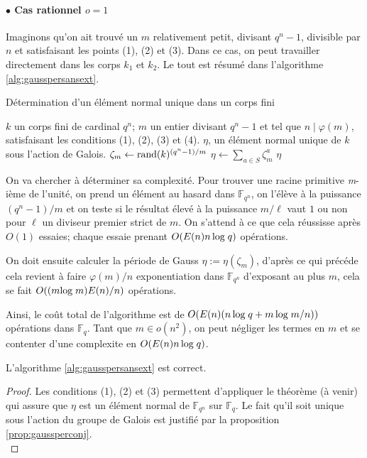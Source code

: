 \documentclass[a4paper]{article} %
\numberwithin{section}{part}
\numberwithin{equation}{section}
\newcommand\nroot[1]{\textit{#1}-ième}
\newcommand\GF[1]{\mathbb{F}_{#1}}
\begin{document}
\paragraph{$\bullet$ Cas rationnel $o = 1$}
Imaginons qu'on ait trouvé un $m$ relativement petit, divisant $q^n - 1$,
divisible par $n$ et satisfaisant les points (1), (2) et (3). Dans ce cas, on 
peut travailler directement dans les corps $k_1$ et $k_2$. Le tout est résumé
dans l'algorithme \ref{alg:gausspersansext}.

\begin{algorithm}
\caption{Détermination d'un élément normal unique dans un corps fini}
\label{alg:gausspersansext}
\begin{algorithmic}[1]
\REQUIRE $k$ un corps fini de cardinal $q^n$; $m$ un entier 
divisant $q^n - 1$ et tel que $n\mid\varphi(m)$, satisfaisant les conditions 
(1), (2), (3) et (4).
\ENSURE $\eta$, un élément normal unique de $k$ sous l'action de Galois.
\bigskip
\REPEAT
    \STATE $\zeta_m \leftarrow \textup{rand}(k)^{(q^n - 1)/m}$
\STATE $\eta \leftarrow \sum_{a\in S}{\zeta_m^a}$
\RETURN $\eta$
\end{algorithmic}
\end{algorithm}
On va chercher à déterminer sa complexité. Pour trouver une racine primitive 
\nroot{m} de l'unité, on prend un élément au hasard dans $\GF{q^n}$, on l'élève 
à la puissance $(q^n - 1)/m$ et on teste si le résultat élevé à la puissance 
$m/\ell$ vaut $1$ ou non pour $\ell$ un diviseur premier strict de $m$. On 
s'attend à ce que cela réussisse après $O(1)$ essaies; chaque essaie prenant 
$O(E(n)n\,\textup{log\;}q)$ opérations.\par
On doit ensuite calculer la période de Gauss $\eta := \eta(\zeta_m)$,
d'après ce qui précéde cela revient à faire $\varphi(m)/n$ exponentiation dans
$\GF{q^n}$ d'exposant au plus $m$, cela se fait $O((m\textup{log\;}m)E(n)/n)$
opérations.\par
Ainsi, le coût total de l'algorithme est de $O(E(n)(n\,\textup{log\;}q +
m\,\textup{log\;}m/n))$ opérations dans $\GF{q}$. Tant que $m\in o(n^2)$, on 
peut négliger les termes en $m$ et se contenter d'une complexite en 
$O(E(n)n\,\textup{log\;}q)$.

\begin{prop}
L'algorithme \ref{alg:gausspersansext} est correct.
\end{prop}
\begin{proof}
Les conditions (1), (2) et (3) permettent d'appliquer le théorème (à venir) qui 
assure que $\eta$ est un élément normal de $\GF{q^n}$ sur $\GF{q}$. Le 
fait qu'il soit unique sous l'action du groupe de Galois est justifié par la 
proposition \ref{prop:gaussperconj}.\\
\end{proof}
\end{document}
